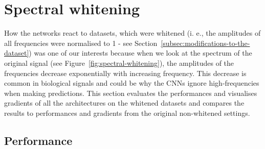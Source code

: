 \clearpage
\section{Spectral whitening}\label{sec:spectral-whitening}

How the networks react to datasets, which were whitened (i. e., the amplitudes of all frequencies were normalised to 1 - see Section~\ref{subsec:modifications-to-the-dataset}) was one of our interests because when we look at the spectrum of the original signal (see Figure~\ref{fig:spectral-whitening}), the amplitudes of the frequencies decrease exponentially with increasing frequency. 
This decrease is common in biological signals and could be why the CNNs ignore high-frequencies when making predictions.
This section evaluates the performances and visualises gradients of all the architectures on the whitened datasets and compares the results to performances and gradients from the original non-whitened settings. 

\subsection{Performance}\label{subsec:pw-performance}

